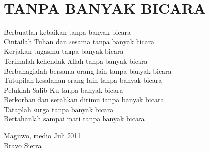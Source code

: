 \section*{TANPA BANYAK BICARA}

Berbuatlah kebaikan tanpa banyak bicara\\
Cintailah Tuhan dan sesama tanpa banyak bicara\\
Kerjakan tugasmu tanpa banyak bicara\\
Terimalah kehendak Allah tanpa banyak bicara\\
Berbahagialah bersama orang lain tanpa banyak bicara\\
Tutupilah kesalahan orang lain tanpa banyak bicara\\
Peluklah Salib-Ku tanpa banyak bicara\\
Berkorban dan serahkan dirimu tanpa banyak bicara\\
Tataplah surga tanpa banyak bicara\\
Bertahanlah sampai mati tanpa banyak bicara

\vspace{0.5cm} 

{\flushleft Maguwo, medio Juli 2011\\
Bravo Sierra}
